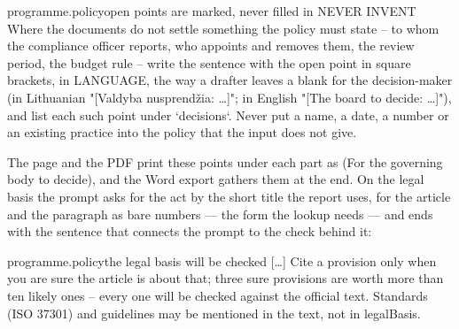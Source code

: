 \begin{promptexcerpt}{programme.policy}{open points are marked, never filled in}
NEVER INVENT
Where the documents do not settle something the policy must state – to whom the compliance officer reports, who appoints and removes them, the review period, the budget rule – write the sentence with the open point in square brackets, in {LANGUAGE}, the way a drafter leaves a blank for the decision-maker (in Lithuanian "[Valdyba nusprendžia: …]"; in English "[The board to decide: …]"), and list each such point under `decisions`. Never put a name, a date, a number or an existing practice into the policy that the input does not give.
\end{promptexcerpt}

The page and the PDF print these points under each part as  (For
the governing body to decide), and the Word export gathers them at the end. On the legal
basis the prompt asks for the act by the short title the report uses, for the article and
the paragraph as bare numbers --- the form the lookup needs --- and ends with the sentence
that connects the prompt to the check behind it:

\begin{promptexcerpt}{programme.policy}{the legal basis will be checked}
[…]
Cite a provision only when you are sure the article is about that; three sure provisions are worth more than ten likely ones – every one will be checked against the official text. Standards (ISO 37301) and guidelines may be mentioned in the text, not in legalBasis.
\end{promptexcerpt}

